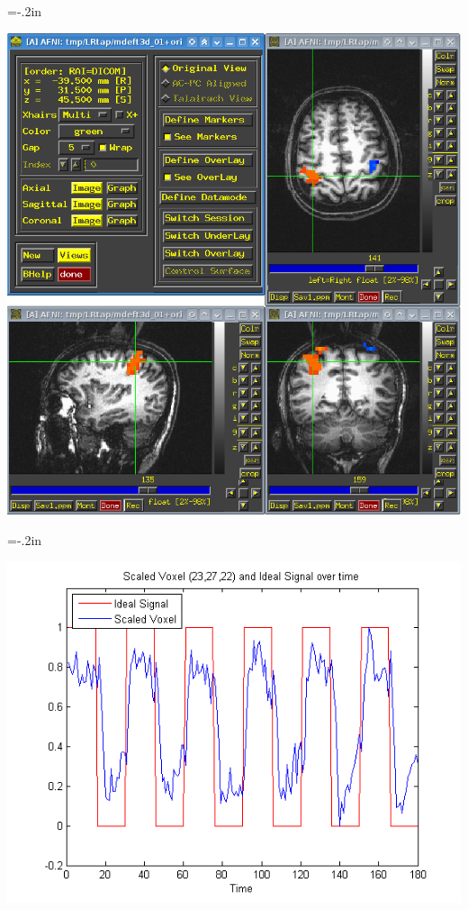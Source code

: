 \documentclass[t,12pt,numbers,fleqn]{beamer}
\begin{document}
\hoffset=-.2in
\begin{frame}[plain]

\includegraphics[width=1.\textwidth]{../Figures/AFNI_screenshot.PNG}

\end{frame}
\hoffset=0in


\hoffset=-.2in
\begin{frame}[plain]

\includegraphics[width=1.\textwidth]{../Figures/scaledvoxelANDIdealsignalVStime_least.png}

\end{frame}
\hoffset=0in
\end{document}
